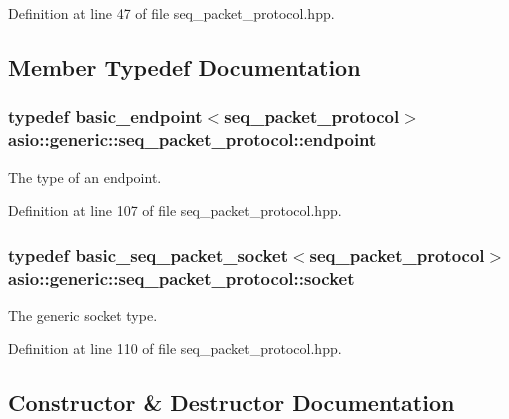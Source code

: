 Definition at line 47 of file seq\+\_\+packet\+\_\+protocol.\+hpp.



\subsection{Member Typedef Documentation}
\hypertarget{classasio_1_1generic_1_1seq__packet__protocol_a61c218617d6ebabb06b8136aab0f9cb7}{}
\subsubsection[{endpoint}]{\setlength{\rightskip}{0pt plus 5cm}typedef {\bf basic\+\_\+endpoint}$<${\bf seq\+\_\+packet\+\_\+protocol}$>$ {\bf asio\+::generic\+::seq\+\_\+packet\+\_\+protocol\+::endpoint}}\label{classasio_1_1generic_1_1seq__packet__protocol_a61c218617d6ebabb06b8136aab0f9cb7}


The type of an endpoint. 



Definition at line 107 of file seq\+\_\+packet\+\_\+protocol.\+hpp.

\hypertarget{classasio_1_1generic_1_1seq__packet__protocol_aa9ffbed9ebed0547505737663a1a0a8f}{}
\subsubsection[{socket}]{\setlength{\rightskip}{0pt plus 5cm}typedef {\bf basic\+\_\+seq\+\_\+packet\+\_\+socket}$<${\bf seq\+\_\+packet\+\_\+protocol}$>$ {\bf asio\+::generic\+::seq\+\_\+packet\+\_\+protocol\+::socket}}\label{classasio_1_1generic_1_1seq__packet__protocol_aa9ffbed9ebed0547505737663a1a0a8f}


The generic socket type. 



Definition at line 110 of file seq\+\_\+packet\+\_\+protocol.\+hpp.



\subsection{Constructor \& Destructor Documentation}
\hypertarget{classasio_1_1generic_1_1seq__packet__protocol_afedfbddd438642e3cdfd7ce2cf0fa5fe}{}
